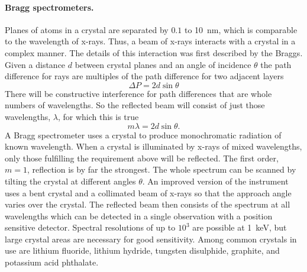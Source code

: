 \paragraph{Bragg spectrometers.} Planes of atoms in a crystal are separated by $0.1$ to 10~nm, which
is comparable to the wavelength of x-rays. Thus, a beam of x-rays interacts with a crystal in 
a complex manner. The details of this interaction was first described by the Braggs. Given
a distance $d$ between crystal planes and an angle of incidence $\theta$ the path difference 
for rays are multiples of the path difference for two adjacent layers
\[ \Delta P=2d\sin\theta \]
There will be constructive interference for path differences that are whole numbers of wavelengths. So the reflected beam will consist of just those wavelengths, $\lambda$, 
for which this is true
\[ m\lambda=2d\sin\theta. \]
A  Bragg spectrometer uses a crystal to produce monochromatic radiation of known wavelength.
When a crystal is illuminated by x-rays of mixed wavelengths, only those fulfilling the requirement above will be reflected. The first order, $m=1$, reflection is by far the strongest.
The whole spectrum can be scanned by tilting the crystal at different angles $\theta$. An improved version of the instrument uses a bent crystal and a collimated beam of x-rays so that 
the approach angle varies over the crystal. The reflected beam then consists of the spectrum at
all wavelengths which can be detected in a single observation with a position sensitive detector. 
Spectral resolutions of up to $10^3$ are possible at 1~keV, but large crystal areas are necessary for good sensitivity.  Among common crystals in use are lithium fluoride, lithium hydride, 
tungsten disulphide, graphite, and potassium acid phthalate. 

%

